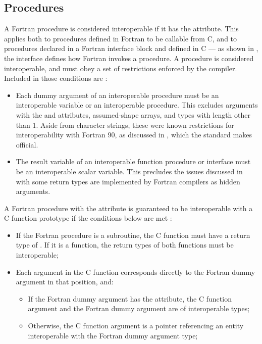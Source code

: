 \subsection{Procedures} \label{sec:interop_f03_calls}

A Fortran procedure is considered interoperable if it has the  attribute. This applies both to procedures defined in Fortran to be callable from C, and to procedures declared in a Fortran interface block and defined in C --- as shown in , the interface defines how Fortran invokes a procedure. A  procedure is considered interoperable, and must obey a set of restrictions enforced by the compiler. Included in those conditions are \cite{adams2008fortran}:
\begin{itemize}
	\item Each dummy argument of an interoperable procedure must be an interoperable variable or an interoperable procedure. This excludes arguments with the  and  attributes, assumed-shape arrays, and  types with length other than 1. Aside from character strings, these were known restrictions for interoperability with Fortran 90, as discussed in , which the standard makes official.
	\item The result variable of an interoperable function procedure or interface must be an interoperable scalar variable. This precludes the issues discussed in  with some return types are implemented by Fortran compilers as hidden arguments.
\end{itemize}

A Fortran procedure with the  attribute is guaranteed to be interoperable with a C function prototype if the conditions below are met \cite{F2003standard}:
\begin{itemize}
	\item If the Fortran procedure is a subroutine, the C function must have a return type of . If it is a function, the return types of both functions must be interoperable;
	\item Each argument in the C function corresponds directly to the Fortran dummy argument in that position, and:
		\begin{itemize}
			\item If the Fortran dummy argument has the  attribute, the C function argument and the Fortran dummy argument are of interoperable types;
			\item Otherwise, the C function argument is a pointer referencing an entity interoperable with the Fortran dummy argument type;
		\end{itemize}
\end{itemize}

